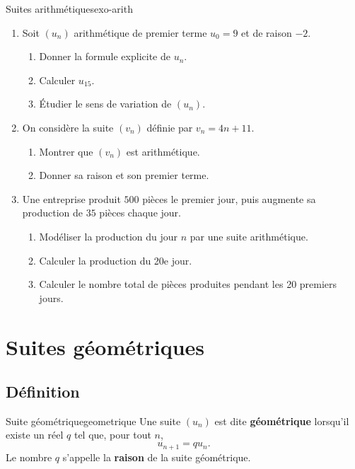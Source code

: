 \documentclass[11pt,a4paper]{article}
\begin{document}
\begin{exercisebox}{Suites arithmétiques}{exo-arith}
\begin{enumerate}
  \item Soit $(u_n)$ arithmétique de premier terme $u_0=9$ et de raison $-2$.
  \begin{enumerate}
    \item Donner la formule explicite de $u_n$.
    \item Calculer $u_{15}$.
    \item Étudier le sens de variation de $(u_n)$.
  \end{enumerate}
  \item On considère la suite $(v_n)$ définie par $v_n=4n+11$.
  \begin{enumerate}
    \item Montrer que $(v_n)$ est arithmétique.
    \item Donner sa raison et son premier terme.
  \end{enumerate}
  \item Une entreprise produit $500$ pièces le premier jour, puis augmente sa production de $35$ pièces chaque jour.
  \begin{enumerate}
    \item Modéliser la production du jour $n$ par une suite arithmétique.
    \item Calculer la production du 20e jour.
    \item Calculer le nombre total de pièces produites pendant les 20 premiers jours.
  \end{enumerate}
\end{enumerate}
\end{exercisebox}

\section{Suites géométriques}

\subsection{Définition}

\begin{definitionbox}{Suite géométrique}{geometrique}
Une suite $(u_n)$ est dite \textbf{géométrique} lorsqu'il existe un réel $q$ tel que, pour tout $n$,
\[
 u_{n+1}=q u_n.
\]
Le nombre $q$ s'appelle la \textbf{raison} de la suite géométrique.
\end{definitionbox}
\end{document}

